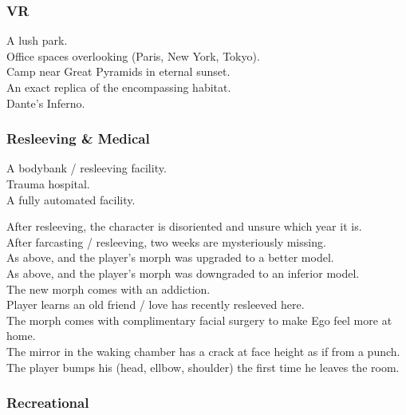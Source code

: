 \documentclass[a4]{article}
\begin{document}
\subsubsection{VR}


\starttableone
A lush park.\\
Office spaces overlooking (Paris, New York, Tokyo).\\
Camp near Great Pyramids in eternal sunset.\\
An exact replica of the encompassing habitat.\\
Dante's Inferno.\\
\stoptableone


\starttableone
\stoptableone





\subsubsection{Resleeving \& Medical}

\starttableone
A bodybank / resleeving facility.\\
Trauma hospital.\\
A fully automated  facility.\\
\stoptableone


\starttableone
After resleeving, the character is disoriented and unsure which year it is.\\
After farcasting / resleeving, two weeks are mysteriously missing.\\
As above, and the player's morph was upgraded to a better model.\\
As above, and the player's morph was downgraded to an inferior model.\\
The new morph comes with an addiction.\\
Player learns an old friend / love has recently resleeved here.\\
The morph comes with complimentary facial surgery to make Ego feel more at home.\\
The mirror in the waking chamber has a crack at face height as if from a punch.\\
The player bumps his (head, ellbow, shoulder) the first time he leaves the room.\\
\stoptableone


\subsubsection{Recreational}
\end{document}
